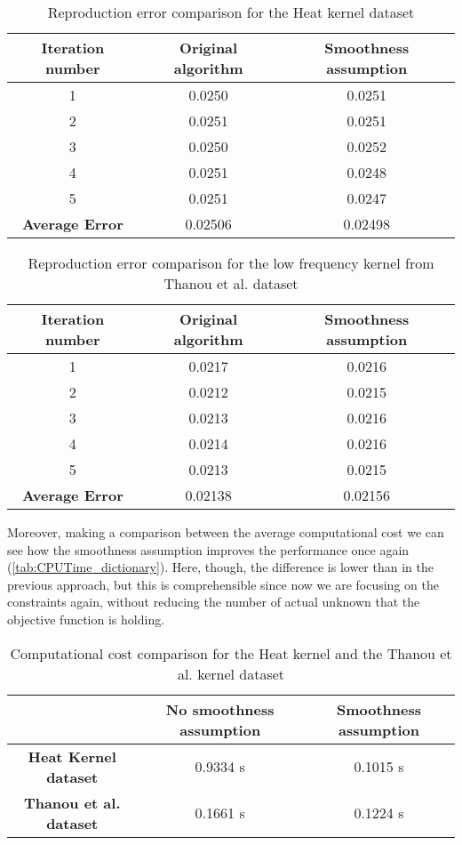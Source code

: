 \begin{table}[htbp]
  \centering
  \begin{tabular}{c|c|c}
    \multicolumn{1}{c|}{\textbf{Iteration number}} &
    \multicolumn{1}{c}{\textbf{Original algorithm}} &
    \multicolumn{1}{|c}{\textbf{Smoothness assumption}}\\
    \hline
    1 & 0.0250 & 0.0251\\
    2 & 0.0251 & 0.0251\\
    3 & 0.0250 & 0.0252\\
    4 & 0.0251 & 0.0248\\
    5 & 0.0251 & 0.0247\\
    \textbf{Average Error} & 0.02506 & 0.02498
  \end{tabular}
  \caption{Reproduction error comparison for the Heat kernel dataset}
  \label{tab:errorHeat}
\end{table}

\begin{table}[htbp]
  \centering
  \begin{tabular}{c|c|c}
    \multicolumn{1}{c|}{\textbf{Iteration number}} &
    \multicolumn{1}{c}{\textbf{Original algorithm}} &
    \multicolumn{1}{|c}{\textbf{Smoothness assumption}}\\
    \hline
    1 & 0.0217 & 0.0216\\
    2 & 0.0212 & 0.0215\\
    3 & 0.0213 & 0.0216\\
    4 & 0.0214 & 0.0216\\
    5 & 0.0213 & 0.0215\\
    \textbf{Average Error} & 0.02138 & 0.02156
  \end{tabular}
  \caption{Reproduction error comparison for the low frequency kernel from Thanou et al. dataset}
  \label{tab:errorDorina}
\end{table}

Moreover, making a comparison between the average computational cost we can see how the smoothness assumption improves the performance once again (\autoref{tab:CPUTime_dictionary}). Here, though, the difference is lower than in the previous approach, but this is comprehensible since now we are focusing on the constraints again, without reducing the number of actual unknown that the objective function is holding.

\begin{table}[htbp]
  \centering
  \begin{tabular}{c|c|c}
    &
    \multicolumn{1}{c}{\textbf{No smoothness assumption}} &
    \multicolumn{1}{|c}{\textbf{Smoothness assumption}}\\
    \hline
    \textbf{Heat Kernel dataset} & 0.9334 s & 0.1015 s\\
    \textbf{Thanou et al. dataset} & 0.1661 s & 0.1224 s\\
  \end{tabular}
  \caption{Computational cost comparison for the Heat kernel and the Thanou et al. kernel dataset}
  \label{tab:CPUTime_dictionary}
\end{table}

